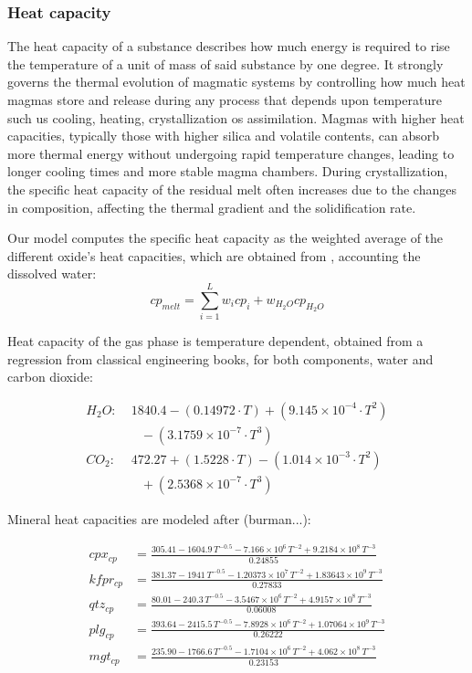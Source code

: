 \subsubsection{Heat capacity}
The heat capacity of a substance describes how much energy is required to rise the temperature of a unit of mass of said substance by one degree. It strongly governs the thermal evolution of magmatic systems by controlling how much heat magmas store and release during any process that depends upon temperature such us cooling, heating, crystallization os assimilation. Magmas with higher heat capacities, typically those with higher silica and volatile contents, can absorb more thermal energy without undergoing rapid temperature changes, leading to longer cooling times and more stable magma chambers. During crystallization, the specific heat capacity of the residual melt often increases due to the changes in composition, affecting the thermal gradient and the solidification rate.

Our model computes the specific heat capacity as the weighted average of the different oxide's heat capacities, which are obtained from \cite{lesher2015}, accounting the dissolved water:
\begin{equation}    
    cp_{melt} = \sum_{i=1}^L w_i cp_i + w_{H_2O} cp_{H_2O}
\end{equation}

Heat capacity of the gas phase is temperature dependent, obtained from a regression from classical engineering books, for both components, water and carbon dioxide:

\begin{equation}
\begin{split}
H_2O: &\; 1840.4 - (0.14972 \cdot T) + (9.145 \times 10^{-4} \cdot T^2) \\
&\quad - (3.1759 \times 10^{-7} \cdot T^3) \\
CO_2: &\; 472.27 + (1.5228 \cdot T) - (1.014 \times 10^{-3} \cdot T^2) \\
&\quad + (2.5368 \times 10^{-7} \cdot T^3)
\end{split}
\end{equation}

Mineral heat capacities are modeled after (burman...):

\begin{equation}
\begin{aligned}
cpx_{cp} &= \frac{305.41 - 1604.9\, T^{-0.5} - 7.166 \times 10^6\, T^{-2} + 9.2184 \times 10^8\, T^{-3}}{0.24855} \\[2ex]
kfpr_{cp} &= \frac{381.37 - 1941\, T^{-0.5} - 1.20373 \times 10^7\, T^{-2} + 1.83643 \times 10^9\, T^{-3}}{0.27833} \\[2ex]
qtz_{cp} &= \frac{80.01 - 240.3\, T^{-0.5} - 3.5467 \times 10^6\, T^{-2} + 4.9157 \times 10^8\, T^{-3}}{0.06008} \\[2ex]
plg_{cp} &= \frac{393.64 - 2415.5\, T^{-0.5} - 7.8928 \times 10^6\, T^{-2} + 1.07064 \times 10^9\, T^{-3}}{0.26222} \\[2ex]
mgt_{cp} &= \frac{235.90 - 1766.6\, T^{-0.5} - 1.7104 \times 10^6\, T^{-2} + 4.062 \times 10^8\, T^{-3}}{0.23153}
\end{aligned}
\end{equation}

